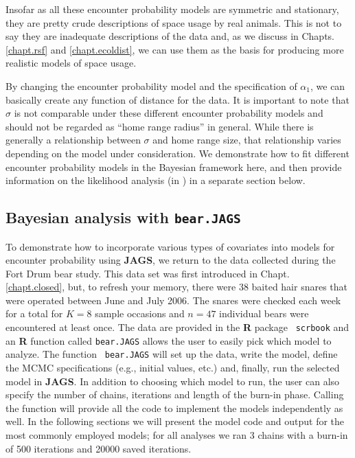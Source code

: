 Insofar as all these encounter probability models are symmetric and
stationary, they are pretty crude descriptions of space usage by real
animals. This is not to say they are inadequate descriptions of the
data and, as we discuss in Chapts. \ref{chapt.rsf} and
\ref{chapt.ecoldist}, we can use them as the basis for producing more
realistic models of space usage.

By changing the encounter probability model and the specification of
$\alpha_1$, we can basically create any function of distance for the
data. It is important to note that $\sigma$ is not comparable under
these different encounter probability models and should not be
regarded as ``home range radius'' in general.  While there is
generally a relationship between $\sigma$ and home range size, that
relationship varies depending on the model under consideration. We
demonstrate how to fit different encounter probability models in the
Bayesian framework here, and then provide information on the
likelihood analysis (in \secr) in a separate section below.

\subsection{Bayesian analysis with {\tt bear.JAGS}}

To demonstrate how to incorporate various types of covariates into
models for encounter probability using {\bf JAGS}, we return to the
data collected during the Fort Drum bear study.  This data set was
first introduced in Chapt. \ref{chapt.closed}, but, to refresh your
memory, there were 38 baited hair snares that were operated between
June and July 2006.  The snares were checked each week for a total for
$K=8$ sample occasions and $n=47$ individual bears were encountered at
least once.  The data are provided in the {\bf R} package \mbox{\tt
  scrbook} and an {\bf R} function called {\tt bear.JAGS} allows the
user to easily pick which model to analyze.  The function {\tt
  bear.JAGS} will set up the data, write the model, define the MCMC
specifications (e.g., initial values, etc.) and, finally, run the
selected model in {\bf JAGS}. In addition to choosing which model to
run, the user can also specify the number of chains, iterations and
length of the burn-in phase. Calling the function will provide all the
code to implement the models independently as well.  In the following
sections we will present the model code and output for the most
commonly employed models; for all analyses we ran 3 chains with a
burn-in of 500 iterations and 20000 saved iterations.

